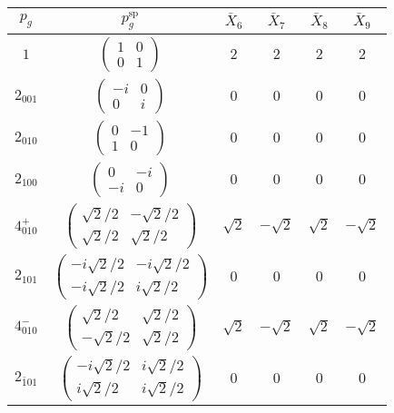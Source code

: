 \documentclass[3p,preprint]{elsarticle}
\begin{document}
\begin{table}[H]
	\begin{tabular}{|c|c||c|c|c|c|}\hline
		$p_g$ & $p_g^{\text{sp}}$ & $\bar{X}_6$ & $\bar{X}_7$ & $\bar{X}_8$ & $\bar{X}_9$   \\ \hline \hline
		$1$ & 				$\left(\begin{array}{cc} 1&0 \\ 0&1 \end{array}\right)$	& $2$ &  $2$ & $2$ &  $2$ \\ \hline
		$2_{001}$ &		$\left(\begin{array}{cc} -i&0 \\ 0&i \end{array}\right)$	& $0$ & $0$ & $0$ & $0$  \\ \hline
		$2_{010}$ &		$\left(\begin{array}{cc} 0&-1 \\ 1&0 \end{array}\right)$	& $0$ & $0$ & $0$ & $0$  \\ \hline
		$2_{100}$ &		$\left(\begin{array}{cc} 0&-i \\ -i&0 \end{array}\right)$	& $0$ & $0$ & $0$ & $0$  \\ \hline
		$4^{+}_{010}$ &		$\left(\begin{array}{cc} \sqrt{2}/2&-\sqrt{2}/2 \\ \sqrt{2}/2&\sqrt{2}/2 \end{array}\right)$	& $\sqrt{2}$ & $-\sqrt{2}$ & $\sqrt{2}$ & $-\sqrt{2}$ \\ \hline
		$2_{101}$ &		$\left(\begin{array}{cc} -i\sqrt{2}/2&-i\sqrt{2}/2 \\ -i\sqrt{2}/2&i\sqrt{2}/2 \end{array}\right)$	& $0$ & $0$ & $0$ & $0$  \\ \hline
		$4^{-}_{010}$ &		$\left(\begin{array}{cc} \sqrt{2}/2&\sqrt{2}/2 \\ -\sqrt{2}/2&\sqrt{2}/2 \end{array}\right)$	& $\sqrt{2}$ & $-\sqrt{2}$ & $\sqrt{2}$ & $-\sqrt{2}$ \\ \hline
		$2_{\bar{1}01}$ &		$\left(\begin{array}{cc} -i\sqrt{2}/2&i\sqrt{2}/2 \\ i\sqrt{2}/2&i\sqrt{2}/2 \end{array}\right)$	& $0$ & $0$ & $0$ & $0$  \\ \hline
		

\end{tabular}
\end{table}
\end{document}
